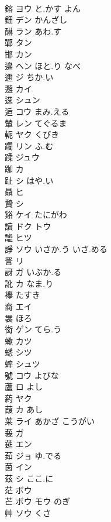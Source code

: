 \documentclass[8pt]{extreport}
\begin{document}
\begin{CJK}{UTF8}{min}
\\	鎔	ヨウ と.かす よん			
\\	鈿	デン かんざし			
\\	醂	ラン あわ.す			
\\	鄲	タン			
\\	邯	カン			
\\	邉	ヘン ほと.り なべ					
\\	邇	ジ ちか.い			
\\	邂	カイ			
\\	逡	シュン			
\\	逅	コウ まみ.える			
\\	輦	レン てぐるま			
\\	軛	ヤク くびき			
\\	躙	リン ふ.む			
\\	蹂	ジュウ			
\\	跏	カ			
\\	趾	シ はや.い			
\\	贔	ヒ			
\\	贄	シ			
\\	谿	ケイ たにがわ			
\\	讀	ドク トウ					
\\	謐	ヒツ			
\\	諍	ソウ いさか.う いさ.める			
\\	詈	リ			
\\	訝	ガ いぶか.る			
\\	訛	カ なま.り			
\\	襷	たすき			
\\	裔	エイ			
\\	袰	ほろ			
\\	衒	ゲン てら.う			
\\	蠍	カツ			
\\	蟋	シツ			
\\	蟀	シュツ			
\\	號	コウ よびな					
\\	蘆	ロ よし			
\\	葯	ヤク			
\\	葭	カ あし			
\\	莱	ライ あかざ こうがい			
\\	莪	ガ			
\\	莚	エン			
\\	茹	ジョ ゆ.でる			
\\	茵	イン			
\\	茲	シ ここ.に			
\\	茫	ボウ			
\\	芒	ボウ モウ のぎ			
\\	艸	ソウ くさ			

\end{CJK}
\end{document}
